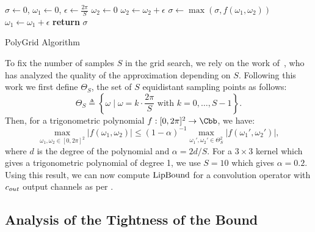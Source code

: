 \begin{algorithm}[htb]
  \begin{algorithmic}[1]
      \State $\sigma \gets 0$, $\omega_1 \gets 0$, $\epsilon \gets \frac{2\pi}{S}$
        \State $\omega_2 \gets 0$
	  \State $\omega_2 \gets \omega_2 + \epsilon$
	  \State $\sigma \gets \max( \sigma, f(\omega_1, \omega_2))$
	\EndFor
	\State $\omega_1 \gets \omega_1 + \epsilon$
      \EndFor
      \State \textbf{return} $\sigma$ 
    \EndProcedure
  \end{algorithmic}
  \caption{PolyGrid Algorithm}
  \label{algorithm:ch5-polygrid}
\end{algorithm}


To fix the number of samples $S$ in the grid search, we rely on the work of~\cite{pfister2018bounding}, who has analyzed the quality of the approximation depending on $S$.
Following this work we first define $\Theta_S$, the set of $S$ equidistant sampling points as follows:
\begin{equation}
  \Theta_S \triangleq \left\{ \omega \mid \omega = k \cdot \frac{2\pi}{S} \mbox{ with }  k = 0, \dots, S-1 \right\}.
\end{equation}
Then, for a trigonometric polynomial $f: [0, 2\pi]^2 \rightarrow \Cbb$, we have:
\begin{equation}
  \max_{\omega_1, \omega_2 \in [0,2\pi]^2} \left| f(\omega_1, \omega_2) \right| \leq (1 - \alpha)^{-1} \max_{\omega_1', \omega_2' \in \Theta_S^2} \left| f(\omega_1', \omega_2') \right|,
\end{equation}
where $d$ is the degree of the polynomial and $\alpha = 2d / S$.
For a $3\times3$ kernel which gives a trigonometric polynomial of degree 1, we use $S = 10$ which gives $\alpha = 0.2$.
Using this result, we can now compute $\mathrm{LipBound}$ for a convolution operator with $c_{out}$ output channels as per .
 


\subsection{Analysis of the Tightness of the Bound}
\label{subsection:ch2-analysis_of_the_tightness_of_the_bound}

